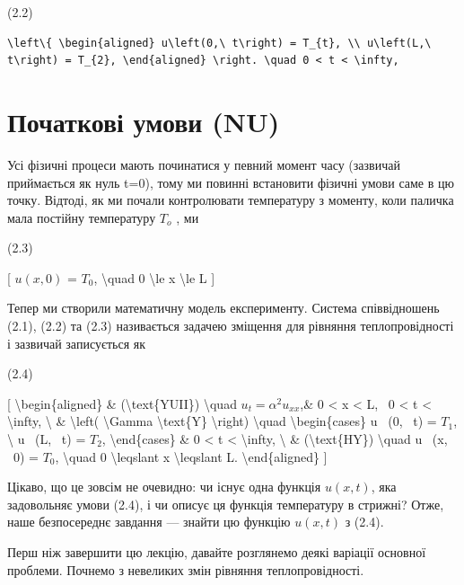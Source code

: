\documentclass[
]{article}
\begin{document}
(2.2)

\begin{verbatim}
\left\{ \begin{aligned} u\left(0,\ t\right) = T_{t}, \\ u\left(L,\ t\right) = T_{2}, \end{aligned} \right. \quad 0 < t < \infty,
\end{verbatim}

\section{Початкові умови
(NU)}\label{ux43fux43eux447ux430ux442ux43aux43eux432ux456-ux443ux43cux43eux432ux438-nu}

Усі фізичні процеси мають починатися у певний момент часу (зазвичай
приймається як нуль t=0), тому ми повинні встановити фізичні умови саме
в цю точку. Відтоді, як ми почали контролювати температуру з моменту,
коли паличка мала постійну температуру \(T_{\mathrm{ }o}\) , ми

(2.3)

{[} \(u(x, 0)\) = \(T_0\), \textbackslash quad 0 \textbackslash le x
\textbackslash le L {]}

Тепер ми створили математичну модель експерименту. Система співвідношень
(2.1), (2.2) та (2.3) називається задачею зміщення для рівняння
теплопровідності і зазвичай записується як

(2.4)

{[} \textbackslash begin\{aligned\} \& (\textbackslash text\{YUII\})
\textbackslash quad \(u_t = \alpha^2 u_{xx}\),\& 0 \textless{} x
\textless{} L, ~0 \textless{} t \textless{} \textbackslash infty,
\textbackslash{} \& \textbackslash left( \textbackslash Gamma
\textbackslash text\{Y\} \textbackslash right) \textbackslash quad
\textbackslash begin\{cases\} u ~(0, ~t) = \(T_1\), \textbackslash{} u
~(L, ~t) = \(T_2\), \textbackslash end\{cases\} \& 0 \textless{} t
\textless{} \textbackslash infty, \textbackslash{} \&
(\textbackslash text\{HY\}) \textbackslash quad u ~(x, ~0) = \(T_0\),
\textbackslash quad 0 \textbackslash leqslant x \textbackslash leqslant
L. \textbackslash end\{aligned\} {]}

Цікаво, що це зовсім не очевидно: чи існує одна функція \(u(x, t)\), яка
задовольняє умови (2.4), і чи описує ця функція температуру в стрижні?
Отже, наше безпосереднє завдання --- знайти цю функцію \(u(x, t)\) з
(2.4).

Перш ніж завершити цю лекцію, давайте розглянемо деякі варіації основної
проблеми. Почнемо з невеликих змін рівняння теплопровідності.
\end{document}
